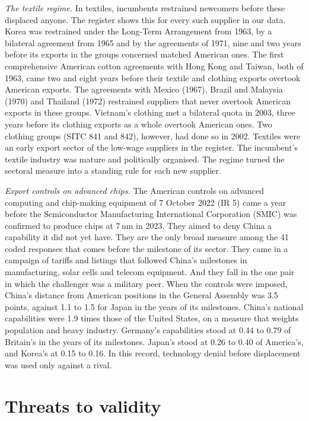 \documentclass[review,authoryear,12pt]{elsarticle}
\begin{document}
\emph{The textile regime.} In textiles, incumbents restrained newcomers before these displaced anyone. The register shows this for every such supplier in our data. Korea was restrained under the Long-Term Arrangement from 1963, by a bilateral agreement from 1965 and by the agreements of 1971, nine and two years before its exports in the groups concerned matched American ones. The first comprehensive American cotton agreements with Hong Kong and Taiwan, both of 1963, came two and eight years before their textile and clothing exports overtook American exports. The agreements with Mexico (1967), Brazil and Malaysia (1970) and Thailand (1972) restrained suppliers that never overtook American exports in these groups. Vietnam's clothing met a bilateral quota in 2003, three years before its clothing exports as a whole overtook American ones. Two clothing groups (SITC 841 and 842), however, had done so in 2002. Textiles were an early export sector of the low-wage suppliers in the register. The incumbent's textile industry was mature and politically organised. The regime turned the sectoral measure into a standing rule for each new supplier.

\emph{Export controls on advanced chips.} The American controls on advanced computing and chip-making equipment of 7 October 2022 (IR 5) came a year before the Semiconductor Manufacturing International Corporation (SMIC) was confirmed to produce chips at 7\,nm in 2023. They aimed to deny China a capability it did not yet have. They are the only broad measure among the 41 coded responses that comes before the milestone of its sector. They came in a campaign of tariffs and listings that followed China's milestones in manufacturing, solar cells and telecom equipment. And they fall in the one pair in which the challenger was a military peer. When the controls were imposed, China's distance from American positions in the General Assembly was 3.5 points, against 1.1 to 1.5 for Japan in the years of its milestones. China's national capabilities were 1.9 times those of the United States, on a measure that weights population and heavy industry. Germany's capabilities stood at 0.44 to 0.79 of Britain's in the years of its milestones. Japan's stood at 0.26 to 0.40 of America's, and Korea's at 0.15 to 0.16. In this record, technology denial before displacement was used only against a rival.

\section{Threats to validity}\label{sec:validity}
\end{document}

